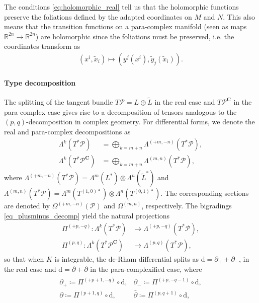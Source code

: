 \documentclass{article}
\newcommand{\Cc}{\mathbf{C}}
\newcommand{\RR}{\mathbb{R}}
\newcommand{\PS}{\mathcal{P}}
\newcommand{\p}{\partial}
\newcommand{\xt}{{\tilde{x}}}
\newcommand{\rd}{\mathrm{d}}
\newcommand{\Lt}{\tl{L}}
\newcommand{\yt}{\tl{y}}
\def\tl{\tilde}
\theoremstyle{definition}
\theoremstyle{definition}
\theoremstyle{remark}
\begin{document}
The conditions \eqref{eq:holomorphic_real} tell us that the holomorphic functions preserve the foliations defined by the adapted coordinates on $M$ and $N$. This also means that the transition functions on a para-complex manifold (seen as maps $\RR^{2n}\rightarrow \RR^{2n}$) are holomorphic since the foliations must be preserved, i.e. the coordinates transform as
\begin{align*}
(x^i,\xt_i)\mapsto (y^j(x^i),\yt_j(\xt_i)).
\end{align*}


\paragraph{Type decomposition} The splitting of the tangent bundle $T\PS=L\oplus \Lt$ in the real case and $T\PS^\Cc$ in the para-complex case gives rise to a decomposition of tensors analogous to the $(p,q)$-decomposition in complex geometry. For differential forms, we denote the real and para-complex decompositions as
\begin{align}\label{eq_plusminus_decomp}
\Lambda^k (T^*\mathcal{P})&=\bigoplus_{k=m+n}\Lambda^{(+m,-n)}(T^*\mathcal{P}),\\
\Lambda^k (T^*\mathcal{P}^\Cc)&=\bigoplus_{k=m+n}\Lambda^{(m,n)}(T^*\mathcal{P}),
\end{align}
where $\Lambda^{(+m,-n)}(T^*\mathcal{P})=\Lambda^m(L^*)\otimes \Lambda^n(\Lt^*)$ and $\Lambda^{(m,n)}(T^*\mathcal{P})=\Lambda^m(T^{(1,0)*})\otimes \Lambda^n(T^{(0,1)*})$. The corresponding sections are denoted by $\Omega^{(+m,-n)}(\mathcal{P})$ and $\Omega^{(m,n)}$, respectively. The bigradings \eqref{eq_plusminus_decomp} yield the natural projections
\begin{align*}
\Pi^{(+p,-q)}:\Lambda^k(T^*\mathcal{P})&\rightarrow \Lambda^{(+p,-q)}(T^*\mathcal{P}),\\
\Pi^{(p,q)}:\Lambda^k(T^*\mathcal{P}^\Cc)&\rightarrow \Lambda^{(p,q)}(T^*\mathcal{P}),
\end{align*}
so that when $K$ is integrable, the de-Rham differential splits as $\rd=\p_++\p_-$, in the real case and $\rd=\p+\bar{\p}$ in the para-complexified case, where
\begin{align*}
\begin{array}{cc}
\p_+ \coloneqq \Pi^{(+p+1,-q)}\circ \rd, & \p_- \coloneqq \Pi^{(+p,-q-1)}\circ \rd,\\
\p \coloneqq \Pi^{(p+1,q)}\circ \rd, & \bar{\p} \coloneqq \Pi^{(p,q+1)}\circ \rd,
\end{array}
\end{align*}
\end{document}
